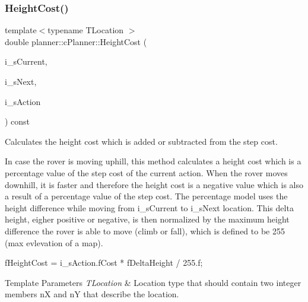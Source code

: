 \subsubsection{\texorpdfstring{Height\+Cost()}{HeightCost()}\hspace{0.1cm}{\footnotesize\ttfamily [2/2]}}
{\footnotesize\ttfamily template$<$typename T\+Location $>$ \\
double planner\+::c\+Planner\+::\+Height\+Cost (\begin{DoxyParamCaption}\item[{T\+Location \&}]{i\+\_\+s\+Current,  }\item[{T\+Location \&}]{i\+\_\+s\+Next,  }\item[{\mbox{\hyperlink{structplanner_1_1t_action}{t\+Action}} \&}]{i\+\_\+s\+Action }\end{DoxyParamCaption}) const\hspace{0.3cm}{\ttfamily [inline]}}



Calculates the height cost which is added or subtracted from the step cost. 

In case the rover is moving uphill, this method calculates a height cost which is a percentage value of the step cost of the current action. When the rover moves downhill, it is faster and therefore the height cost is a negative value which is also a result of a percentage value of the step cost. The percentage model uses the height difference while moving from i\+\_\+s\+Current to i\+\_\+s\+Next location. This delta height, eigher positive or negative, is then normalized by the maximum height difference the rover is able to move (climb or fall), which is defined to be 255 (max evlevation of a map). 
\begin{DoxyCode}
fHeightCost = i\_sAction.fCost * fDeltaHeight / 255.f;
\end{DoxyCode}



\begin{DoxyTemplParams}{Template Parameters}
{\em T\+Location} & Location type that should contain two integer members nX and nY that describe the location. \\
\hline
\end{DoxyTemplParams}

